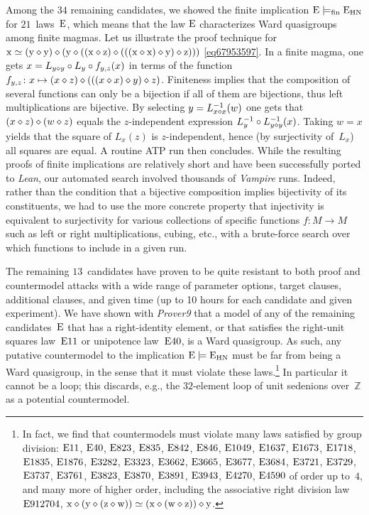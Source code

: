 Among the $34$ remaining candidates, we showed the finite implication $\mathrm{E}\models_{\mathrm{fin}}\mathrm{E}_{\mathrm{HN}}$ for $21$~laws~$\mathrm{E}$, which means that the law $\mathrm{E}$ characterizes Ward quasigroups among finite magmas.  Let us illustrate the proof technique for $\mathrm{x} \simeq (\mathrm{y} \diamond \mathrm{y}) \diamond (\mathrm{y} \diamond ((\mathrm{x} \diamond \mathrm{z}) \diamond (((\mathrm{x} \diamond \mathrm{x}) \diamond \mathrm{y}) \diamond \mathrm{z})))$ \eqref{eq67953597}.  In a finite magma, one gets $x = L_{y\diamond y} \circ L_y \circ f_{y,z}(x)$ in terms of the function $f_{y,z}\colon x \mapsto (x\diamond z) \diamond (((x \diamond x) \diamond y) \diamond z)$.  Finiteness implies that the composition of several functions can only be a bijection if all of them are bijections, thus left multiplications are bijective.  By selecting $y=L_{x\diamond x}^{-1}(w)$ one gets that $(x\diamond z)\diamond (w\diamond z)$ equals the $z$-independent expression $L_y^{-1} \circ L_{y\diamond y}^{-1}(x)$.  Taking $w=x$ yields that the square of $L_x(z)$ is $z$-independent, hence (by surjectivity of~$L_x$) all squares are equal.  A routine ATP run then concludes.
While the resulting proofs of finite implications are relatively short and have been successfully ported to \emph{Lean}, our automated search involved thousands of \emph{Vampire} runs.
Indeed, rather than the condition that a bijective composition implies bijectivity of its constituents, we had to use the more concrete property that injectivity is equivalent to surjectivity for various collections of specific functions $f\colon M\to M$ such as left or right multiplications, cubing, etc.\@, with a brute-force search over which functions to include in a given run.

The remaining $13$~candidates have proven to be quite resistant to both proof and countermodel attacks with a wide range of parameter options, target clauses, additional clauses, and given time (up to 10 hours for each candidate and given experiment).  We have shown with \emph{Prover9} that a model of any of the remaining candidates~$\mathrm{E}$ that has a right-identity element, or that satisfies the right-unit squares law~$\mathrm{E}11$ or unipotence law~$\mathrm{E}40$, is a Ward quasigroup.  As such, any putative countermodel to the implication $\mathrm{E}\models\mathrm{E}_{\mathrm{HN}}$ must be far from being a Ward quasigroup, in the sense that it must violate these laws.\footnote{In fact, we find that countermodels must violate many laws satisfied by group division: $\mathrm{E}11$, $\mathrm{E}40$, $\mathrm{E}823$, $\mathrm{E}835$, $\mathrm{E}842$, $\mathrm{E}846$, $\mathrm{E}1049$, $\mathrm{E}1637$, $\mathrm{E}1673$, $\mathrm{E}1718$, $\mathrm{E}1835$, $\mathrm{E}1876$, $\mathrm{E}3282$, $\mathrm{E}3323$, $\mathrm{E}3662$, $\mathrm{E}3665$, $\mathrm{E}3677$, $\mathrm{E}3684$, $\mathrm{E}3721$, $\mathrm{E}3729$, $\mathrm{E}3737$, $\mathrm{E}3761$, $\mathrm{E}3823$, $\mathrm{E}3870$, $\mathrm{E}3891$, $\mathrm{E}3943$, $\mathrm{E}4270$, $\mathrm{E}4590$ of order up to~$4$, and many more of higher order, including the associative right division law $\mathrm{E}912704$, $\mathrm{x}\diamond(\mathrm{y}\diamond(\mathrm{z}\diamond\mathrm{w})) \simeq(\mathrm{x}\diamond(\mathrm{w}\diamond\mathrm{z}))\diamond\mathrm{y}$.}  In particular it cannot be a loop; this discards, e.g., the $32$-element loop of unit sedenions over~$\mathbb{Z}$ as a potential countermodel.

